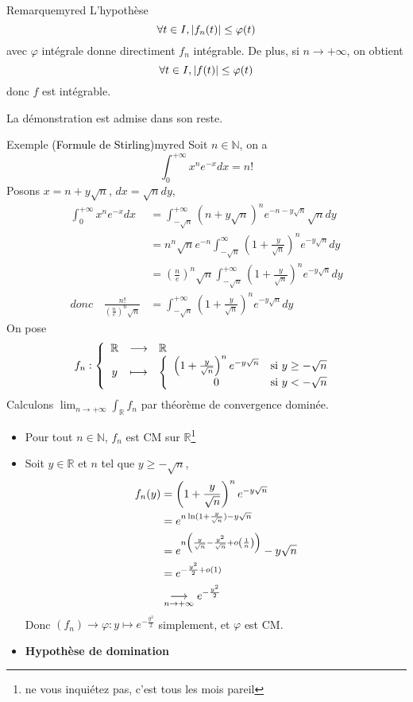     \begin{omed}{Remarque}{myred}
        L’hypothèse 
        \[ \forall t \in I, \left\lvert f_n(t)\right\rvert \leq \varphi(t) \]  
        avec $\varphi$ intégrale donne directiment $f_n$ intégrable. De plus, si $n \to +\infty$, on obtient 
        \[ \forall t \in I, \left\lvert f(t)\right\rvert \leq \varphi(t) \]   
        donc $f$ est intégrable. 

        La démonstration est admise dans son reste.
    \end{omed}

    \begin{omed}{Exemple \textcolor{black}{(Formule de Stirling)}}{myred}
        Soit $n \in \mathbb{N}$, on a 
        \[ \int_{0}^{+\infty} x^n e^{-x} dx = n! \]
        Posons $x = n + y \sqrt{n}$, $dx = \sqrt{n} dy$, 
        \begin{align*}
            \int_{0}^{+\infty} x^n e^{-x} dx
            &= \int_{-\sqrt{n }}^{+\infty} \left( n + y \sqrt{n} \right)^n e^{-n - y \sqrt{n}} \sqrt{n} dy \\
            &= n^n \sqrt{n} e^{-n} \int_{-\sqrt{n}}^{\infty} \left( 1 + \frac{y}{\sqrt{n}} \right)^n e^{-y \sqrt{n}} dy \\
            &= \left( \frac{n}{e} \right)^n \sqrt{n} \int_{-\sqrt{n}}^{+\infty} \left( 1 + \frac{y}{\sqrt{n}} \right)^n e^{-y \sqrt{n}} dy \\
            \textit{donc} \quad \frac{n!}{\left( \frac{n}{e} \right)^n \sqrt{n}}
            &= \int_{-\sqrt{n}}^{+\infty} \left( 1 + \frac{y}{\sqrt{n}} \right)^n e^{-y \sqrt{n}} dy 
        \end{align*}
        On pose 
        \[ \fonction{f_n}{\mathbb{R}}{\mathbb{R}}{y}{\sisi{\left( 1 + \frac{y}{\sqrt{n}} \right)^n e^{-y \sqrt{n}}}{y \geq - \sqrt{n}}{0}{y < -\sqrt{n}}} \]   
        Calculons $\lim_{n \to +\infty} \int_{\mathbb{R}} f_n$ par théorème de convergence dominée.
        \begin{itemize}
            \item Pour tout $n \in \mathbb{N}$, $f_n$ est CM sur $\mathbb{R}$\footnote{ne vous inquiétez pas, c’est tous les mois pareil}
            \item Soit $y \in \mathbb{R}$ et $n$ tel que $y \geq - \sqrt{n}$, 
            \begin{align*}
                f_n(y) 
                &= \left( 1 + \frac{y}{\sqrt{n}} \right)^n e^{-y \sqrt{n}} \\
                &= e^{n \ln (1 + \frac{y}{\sqrt{n}}) - y \sqrt{n}} \\
                &= e^{n \left( \frac{y}{\sqrt{n}} - \frac{y^2}{\sqrt{n}}  + o\left( \frac{1}{n} \right)\right)} - y \sqrt{n} \\
                &= e^{-\frac{y^2}{2} + o(1)} \\
                &\underset{n \rightarrow +\infty}{\longrightarrow} e^{-\frac{y^2}{2}} 
            \end{align*}
            Donc $(f_n) \to \varphi : y \mapsto e^{-\frac{y^2}{2}}$ simplement, et $\varphi$ est CM.
            \item \textbf{Hypothèse de domination} 
            

\end{itemize}
\end{omed}
